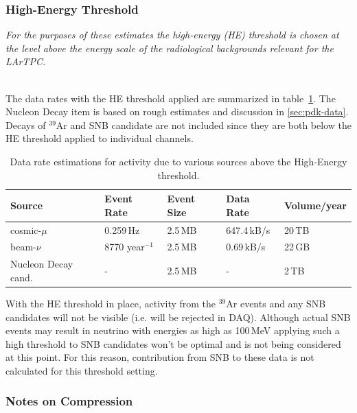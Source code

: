 \subsubsection{High-Energy Threshold}
\textit{For the purposes of these estimates the  high-energy (HE) threshold is chosen at the level above 
the energy scale of the radiological backgrounds relevant for the LArTPC.}

\ 
\\
\noindent
The data rates with the HE threshold applied are summarized in table~\ref{tab:he-volume}.
The Nucleon Decay item is based on rough estimates and discussion in \ref{sec:pdk-data}.
Decays of $^{39}$Ar and SNB candidate are not included since they are both below the HE
threshold applied to individual channels.

\begin{table}[ht!]
\centering
\begin{tabular}{| p{1.6in} | p{0.92in} | p{0.74in} | p{1in} | p{0.9in} |}		\hline	
Source & Event Rate & Event Size & Data Rate & Volume/year \\ \hline
cosmic-$\mu$ & 0.259\,Hz & 2.5\,MB & 647.4\,kB/s & 20\,TB \\ \hline
beam-$\nu$ & 8770 year$^{-1}$ & 2.5\,MB & 0.69\,kB/s & 22\,GB \\
\hline
Nucleon Decay cand. & - & 2.5\,MB & - & 2\,TB\\ \hline
\end{tabular}
\caption{Data rate estimations for activity due to
various sources above the High-Energy threshold.}
\label{tab:he-volume}
\end{table}

\noindent
With the HE threshold in place, activity from the $^{39}$Ar events and any SNB
candidates will not be visible (i.e. will be rejected in DAQ). Although actual SNB
events may result in neutrino with energies as high as 100\,MeV applying such a high
threshold to SNB candidates won't be optimal and is not being considered at this point.
For this reason, contribution from SNB to these data is not calculated for this threshold setting.


\subsubsection{Notes on Compression}
\label{sec:data-compression}

